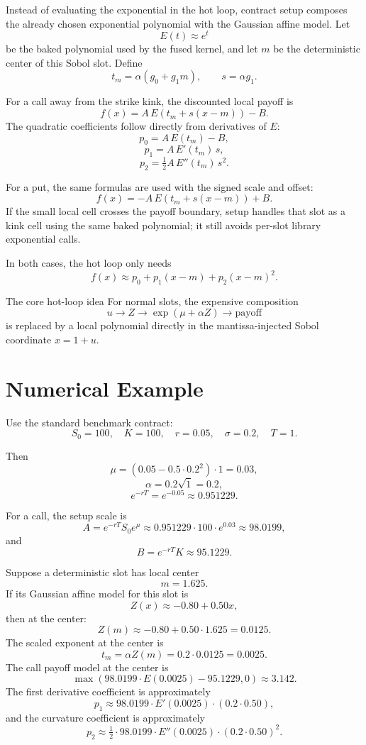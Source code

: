 \documentclass[11pt,a4paper]{article}
\begin{document}
Instead of evaluating the exponential in the hot loop, contract setup composes
the already chosen exponential polynomial with the Gaussian affine model. Let
\[
  E(t) \approx e^t
\]
be the baked polynomial used by the fused kernel, and let \(m\) be the
deterministic center of this Sobol slot. Define
\[
  t_m = \alpha(g_0+g_1m),\qquad s=\alpha g_1.
\]

For a call away from the strike kink, the discounted local payoff is
\[
  f(x)=A\,E(t_m+s(x-m))-B.
\]
The quadratic coefficients follow directly from derivatives of \(E\):
\[
  p_0=A\,E(t_m)-B,
\]
\[
  p_1=A\,E'(t_m)\,s,
\]
\[
  p_2=\tfrac12 A\,E''(t_m)\,s^2.
\]

For a put, the same formulas are used with the signed scale and offset:
\[
  f(x)=-A\,E(t_m+s(x-m))+B.
\]
If the small local cell crosses the payoff boundary, setup handles that slot as
a kink cell using the same baked polynomial; it still avoids per-slot library
exponential calls.

In both cases, the hot loop only needs
\[
  f(x) \approx p_0 + p_1(x-m) + p_2(x-m)^2.
\]

\begin{keybox}{The core hot-loop idea}
For normal slots, the expensive composition
\[
  u \rightarrow Z \rightarrow \exp(\mu+\alpha Z) \rightarrow \text{payoff}
\]
is replaced by a local polynomial directly in the mantissa-injected Sobol
coordinate \(x=1+u\).
\end{keybox}

\section{Numerical Example}

Use the standard benchmark contract:
\[
  S_0=100,\quad K=100,\quad r=0.05,\quad \sigma=0.2,\quad T=1.
\]

Then
\[
  \mu = (0.05 - 0.5\cdot0.2^2)\cdot1 = 0.03,
\]
\[
  \alpha = 0.2\sqrt{1}=0.2,
\]
\[
  e^{-rT}=e^{-0.05}\approx0.951229.
\]

For a call, the setup scale is
\[
  A=e^{-rT}S_0e^\mu
   \approx 0.951229\cdot100\cdot e^{0.03}
   \approx 98.0199,
\]
and
\[
  B=e^{-rT}K \approx95.1229.
\]

Suppose a deterministic slot has local center
\[
  m=1.625.
\]
If its Gaussian affine model for this slot is
\[
  Z(x)\approx -0.80 + 0.50x,
\]
then at the center:
\[
  Z(m)\approx -0.80 + 0.50\cdot1.625 = 0.0125.
\]
The scaled exponent at the center is
\[
  t_m=\alpha Z(m)=0.2\cdot0.0125=0.0025.
\]
The call payoff model at the center is
\[
  \max(98.0199\cdot E(0.0025) - 95.1229,0)
  \approx 3.142.
\]
The first derivative coefficient is approximately
\[
  p_1 \approx 98.0199\cdot E'(0.0025)\cdot(0.2\cdot0.50),
\]
and the curvature coefficient is approximately
\[
  p_2 \approx \tfrac12\cdot98.0199\cdot E''(0.0025)\cdot(0.2\cdot0.50)^2.
\]
\end{document}
